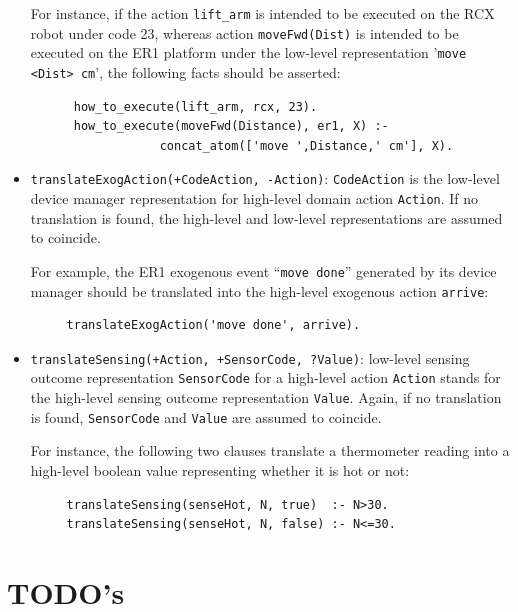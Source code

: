\documentclass[11pt]{article}
\begin{document}
\begin{itemize}
  For instance, if the action \texttt{lift\_arm} is intended to be executed on
  the RCX robot under code 23, whereas action \texttt{moveFwd(Dist)} is intended
  to be executed on the ER1 platform under the low-level representation
  '\texttt{move <Dist> cm}', the following facts should be asserted:
  \begin{verbatim}
      how_to_execute(lift_arm, rcx, 23).
      how_to_execute(moveFwd(Distance), er1, X) :-
                  concat_atom(['move ',Distance,' cm'], X).
  \end{verbatim}
  
\item \texttt{translateExogAction(+CodeAction, -Action)}: 
\texttt{CodeAction} is the low-level device manager representation for
high-level domain action \texttt{Action}. If no translation is found, the
high-level and low-level representations are assumed to	coincide.
  
For example, the ER1 exogenous event ``\texttt{move done}'' generated by
its device manager should be translated into the high-level exogenous action
\texttt{arrive}:

\begin{verbatim}
     translateExogAction('move done', arrive).
\end{verbatim}
  
\item \texttt{translateSensing(+Action, +SensorCode, ?Value)}: 
  low-level sensing outcome representation \texttt{SensorCode} for a
  high-level action \texttt{Action} stands for the high-level sensing
  outcome representation \texttt{Value}.  
  Again, if no translation is found, \texttt{SensorCode} and \texttt{Value}
  are assumed to coincide.
  
  For instance, the following two clauses translate a thermometer reading
  into a high-level boolean value representing whether it is hot or not:
  \begin{verbatim}
     translateSensing(senseHot, N, true)  :- N>30.
     translateSensing(senseHot, N, false) :- N<=30.
  \end{verbatim}
\end{itemize}



\section{TODO's}\label{sec:todo}
\end{document}
